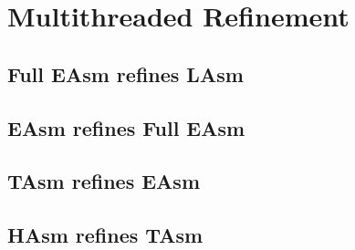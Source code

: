 \section{Multithreaded Refinement}

\noindent{}


\label{sec:multithreaded-refinement}

\noindent{}

\noindent{}


\subsection{Full EAsm refines LAsm}
\label{subsec:full-easm-refines-lasm}

\noindent{}

\subsection{EAsm refines Full EAsm}
\label{subsec:easm-refines-easm}

\noindent{}


\subsection{TAsm refines EAsm}
\label{subsec:tasm-refines-easm}

\noindent{}


\subsection{HAsm refines TAsm}
\label{subsec:hasm-refines-tasm}

\noindent{}

\noindent{}


